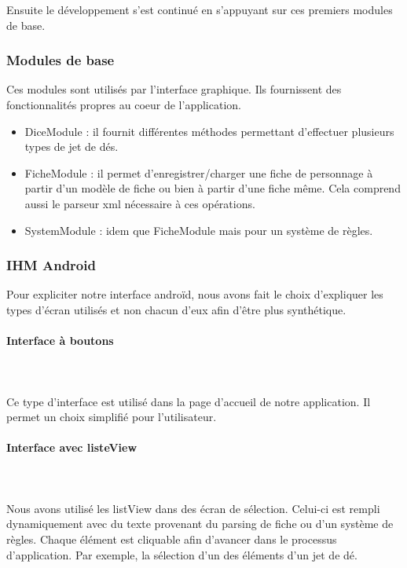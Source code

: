 \documentclass[11pt,a4paper]{article}
\begin{document}
Ensuite le développement s'est continué en s'appuyant sur ces premiers modules
de base.



\subsubsection{Modules de base}

Ces modules sont utilisés par l'interface graphique. Ils fournissent des
fonctionnalités propres au coeur de l'application.

\begin{itemize}
  \item DiceModule : il fournit différentes méthodes permettant d'effectuer
  plusieurs types de jet de dés.
  \item FicheModule : il permet d'enregistrer/charger une fiche de personnage à
  partir d'un modèle de fiche ou bien à partir d'une fiche même. Cela comprend
  aussi le parseur xml nécessaire à ces opérations.
  \item SystemModule : idem que FicheModule mais pour un système de règles.
\end{itemize}

\subsubsection{IHM Android}

Pour expliciter notre interface androïd, nous avons fait le choix d'expliquer
les types d'écran utilisés et non chacun d'eux afin d'être plus synthétique.

\paragraph{Interface à boutons}
~\\
~\\
 Ce type d'interface est utilisé dans la page d'accueil de notre application.
 Il permet un choix simplifié pour l'utilisateur.

\paragraph{Interface avec listeView}
~\\
~\\
Nous avons utilisé les listView dans des écran de sélection. Celui-ci est rempli
dynamiquement avec du texte provenant du parsing de fiche ou d'un système de
règles. Chaque élément est cliquable afin d'avancer dans le processus
d'application. Par exemple, la sélection d'un des éléments d'un jet de dé.\\
\end{document}
